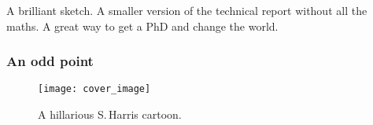 \documentclass[english,twoside,12pt]{extarticle}
\begin{document}
\begin{infommitemize}
	 A brilliant sketch.
	 A smaller version of the technical report without all the maths.
	 A great way to get a PhD and change the world. 
\end{infommitemize}

\subsubsection*{An odd point}
\begin{figure}[htb]
\centering
\texttt{[image: cover\_image]}
\caption{A hillarious S.\,Harris cartoon.}
\label{fig:harris_cartoon}
\end{figure}

\lipsum[1]





\begin{small}
	\nocite{*} %
	
\end{small}
\clearpage
\end{document}
